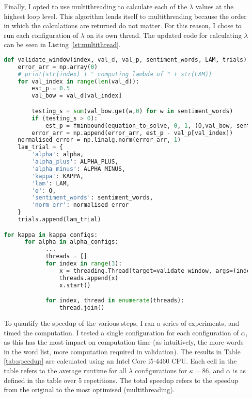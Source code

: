 \documentclass[ oneside,%
                    author={Joshua Felmeden},
                    degree={MEng},
                     title={Sentiment Analysis of Financial Headlines Based on Realised Stock Returns},
                  subtitle={Research}]{dissertation}
\begin{document}
Finally, I opted to use multithreading to calculate each of the $\lambda$ values at the highest loop level. This algorithm lends itself to multithreading because the order in which the calculations are returned do not matter. For this reason, I chose to run each configuration of $\lambda$ on its own thread. The updated code for calculating $\lambda$ can be seen in Listing \ref{lst:multithread}.

\begin{lstlisting}[float={!htb},caption={Multithreadling Lambda},label={lst:multithread},language=Python]
def validate_window(index, val_d, val_p, sentiment_words, LAM, trials):
    error_arr = np.array(0)
    # print(str(index) + " computing lambda of " + str(LAM))
    for val_index in range(len(val_d)):
        est_p = 0.5
        val_bow = val_d[val_index]

        testing_s = sum(val_bow.get(w,0) for w in sentiment_words)
        if (testing_s > 0):
            est_p = fminbound(equation_to_solve, 0, 1, (O,val_bow, sentiment_words,testing_s,LAM))
        error_arr = np.append(error_arr, est_p - val_p[val_index])
    normalised_error = np.linalg.norm(error_arr, 1)
    lam_trial = {
        'alpha': alpha,
        'alpha_plus': ALPHA_PLUS,
        'alpha_minus': ALPHA_MINUS,
        'kappa': KAPPA,
        'lam': LAM,
        'o': O,
        'sentiment_words': sentiment_words,
        'norm_err': normalised_error
    }
    trials.append(lam_trial)

for kappa in kappa_configs:
      for alpha in alpha_configs:
            ...
            threads = []
            for index in range(3):
                x = threading.Thread(target=validate_window, args=(index,val_d, val_p, sentiment_words,lambda_configs[index],trials))
                threads.append(x)
                x.start()

            for index, thread in enumerate(threads):
                thread.join()
\end{lstlisting}

To quantify the speedup of the various steps, I ran a series of experiments, and timed the computation. I tested a single configuration for each configuration of $\alpha$, as this has the most impact on computation time (as intuitively, the more words in the word list, more computation required in validation). The results in Table \ref{tab:speedup} are calculated using an Intel Core i5-4460 CPU. Each cell in the table refers to the average runtime for all $\lambda$ configurations for $\kappa = 86$, and $\alpha$ is as defined in the table over 5 repetitions. The total speedup refers to the speedup from the original to the most optimised (multithreading).
\end{document}
